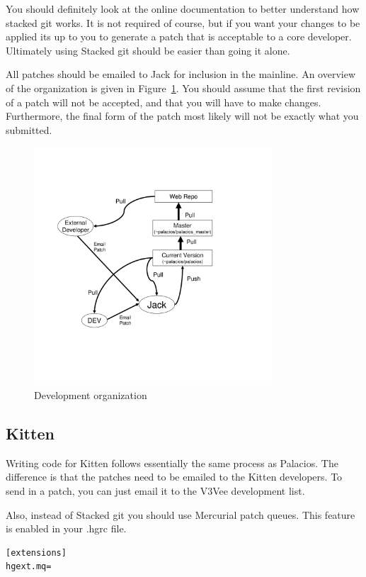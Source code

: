\documentclass[11pt]{article}
\begin{document}
You should definitely look at the online documentation to better
understand how stacked git works. It is not required of course, but if
you want your changes to be applied its up to you to generate a patch
that is acceptable to a core developer. Ultimately using Stacked git
should be easier than going it alone.


All patches should be emailed to Jack for inclusion in the
mainline. An overview of the organization is given in
Figure~\ref{fig:process}. You should assume that the first revision of
a patch will not be accepted, and that you will have to make
changes. Furthermore, the final form of the patch most likely will not
be exactly what you submitted. 

 
\begin{figure}[t]
\begin{center}
\includegraphics[height=3.5in]{dev_chart.pdf}
\end{center}
\caption{Development organization}
\label{fig:process}
\end{figure}


\subsection{Kitten}

Writing code for Kitten follows essentially the same process as
Palacios. The difference is that the patches need to be emailed to the
Kitten developers. To send in a patch, you can just email it to the
V3Vee development list.


Also, instead of Stacked git you should use Mercurial patch
queues. This feature is enabled in your .hgrc file.
\begin{verbatim}
[extensions]
hgext.mq=
\end{verbatim}
\end{document}
